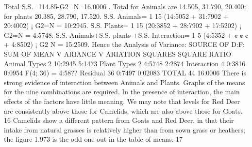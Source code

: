 \documentclass[a4paper,12pt]{article}
\begin{document}
Total S.S.=114.85-G2=N=16.0006 .
Total for Animals are 14.505, 31.790, 20.400; for plants 20.385, 28.790, 17.520.
S.S. Animals= 1
15 (14:5052 + 31:7902 + 20:4002) ¡ G2=N = 10:2945.
S.S. Plants= 1
15 (20:3852 + 28:7902 + 17:5202) ¡ G2=N = 4:5748.
S.S. Animals+S.S. plants +S.S. Interaction= 1
5 (4:5352 + ¢ ¢ ¢ + 4:8502) ¡ G2
N = 15:2509.
Hence the Analysis of Variance:
SOURCE OF D:F: SUM OF MEAN V ARIANCE
V ARIATION SQUARES SQUARE RATIO
Animal Types 2 10:2945 5:1473
Plant Types 2 4:5748 2:2874
Interaction 4 0:3816 0:0954 F(4; 36) = 4:58??
Residual 36 0:7497 0:02083
TOTAL 44 16:0006
There is strong evidence of interaction between Animals and Plants. Graphs of the means for
the nine combinations are required.
In the presence of interaction, the main effects of the factors have little meaning. We may
note that levels for Red Deer are consistently above those for Camelids, which are also above those
for Goats.
16
Camelids show a different pattern from Goats and Red Deer, in that their intake from natural
grasses is relatively higher than from sown grass or heathers; the figure 1.973 is the odd one out
in the table of means.
17
\end{document}
